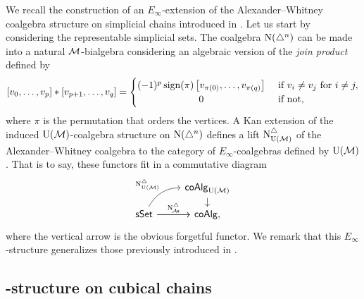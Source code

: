 We recall the construction of an $E_\infty$-extension of the Alexander--Whitney coalgebra structure on simplicial chains introduced in \cite{medina2020prop1}.
Let us start by considering the representable simplicial sets.
The coalgebra $\operatorname{N}(\triangle^n)$ can be made into a natural $\mathcal{M}$-bialgebra considering an algebraic version of the \textit{join product} defined by
\begin{equation*}
	\left[v_0, \dots, v_p \right] \ast \left[v_{p+1}, \dots, v_q\right] =
	\begin{cases}
		(-1)^{p} \sign(\pi) \left[v_{\pi(0)}, \dots, v_{\pi(q)}\right] &
		\text{ if } v_i \neq v_j \text{ for } i \neq j, \\
		\hfil 0 & \text{ if not},
	\end{cases}
\end{equation*}
where $\pi$ is the permutation that orders the vertices.
A Kan extension of the induced ${\operatorname{U}(\mathcal{M})}$-coalgebra structure on $\operatorname{N}(\triangle^n)$ defines a lift $\operatorname{N^{\triangle}_{{\operatorname{U}(\mathcal{M})}}}$ of the Alexander--Whitney coalgebra to the category of $E_\infty$-coalgebras defined by ${\operatorname{U}(\mathcal{M})}$.
That is to say, these functors fit in a commutative diagram
\begin{equation*}
	\begin{tikzcd}[column sep=normal, row sep=small]
		& \coAlg_{\UM} \arrow[d] \\
		\sSet \arrow[r]
		\arrow[ur,out=60, in=180, "\schainsUM"]
		\arrow[r, "\schainsA"]
		& \coAlg,
	\end{tikzcd}
\end{equation*}
where the vertical arrow is the obvious forgetful functor.
We remark that this $E_\infty$-structure generalizes those previously introduced in \cite{mcclure2003multivariable,berger2004combinatorial}.

\subsection{\pdfEinfty-structure on cubical chains}\label{ss:cubical e-infty}

